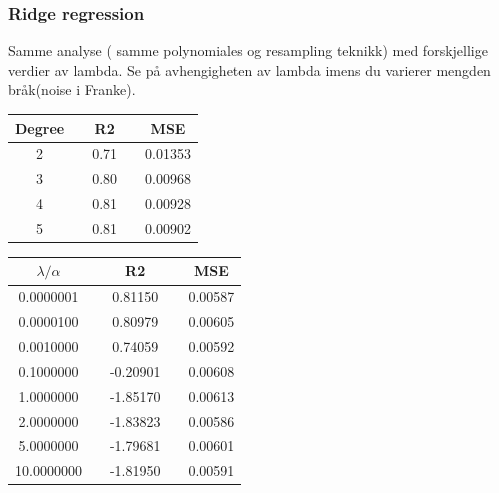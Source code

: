  
\subsubsection{Ridge regression}
Samme analyse ( samme polynomiales og resampling teknikk) med forskjellige verdier av lambda. %
Se på avhengigheten av lambda imens du varierer mengden bråk(noise i Franke).
 
 \begin{center}
 \label{tab:Ridge_Degree_R2_MSE}
 \begin{tabularx}{\textwidth}{c X c X c  }
     \hline
     \hline
         Degree && R2 && MSE \\
         \hline
2      && 0.71 && 0.01353 \\ 
3      && 0.80 && 0.00968 \\ 
4      && 0.81 && 0.00928 \\ 
5      && 0.81 && 0.00902 \\ \hline
 \end{tabularx}
 \end{center}
 
\begin{center}
 \label{tab:OLS_lambda_R2_MSE}
 \begin{tabularx}{\textwidth}{c X c X c  }
     \hline
     \hline
         $\lambda/\alpha$ && R2 && MSE \\
         \hline
 0.0000001  && 0.81150  && 0.00587 \\
0.0000100  && 0.80979  && 0.00605 \\
0.0010000  && 0.74059  && 0.00592 \\
0.1000000  && -0.20901 && 0.00608 \\
1.0000000  && -1.85170 && 0.00613 \\
2.0000000  && -1.83823 && 0.00586 \\
5.0000000  && -1.79681 && 0.00601 \\
10.0000000 && -1.81950 && 0.00591\\ \hline
 \end{tabularx}
 \end{center}


